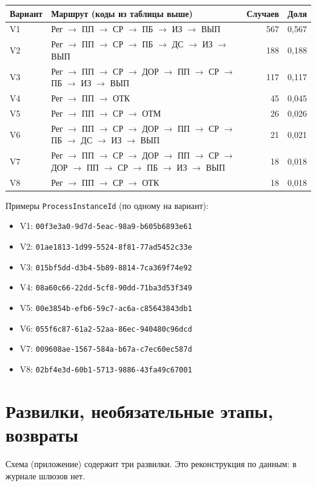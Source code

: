\documentclass[11pt,a4paper]{article}
\begin{document}
\begin{center}\small
\begin{tabular}{@{}lp{10.8cm}rr@{}}\toprule
Вариант & Маршрут (коды из таблицы выше) & Случаев & Доля\\\midrule
V1 & Рег $\to$ ПП $\to$ СР $\to$ ПБ $\to$ ИЗ $\to$ ВЫП & 567 & 0,567 \\
V2 & Рег $\to$ ПП $\to$ СР $\to$ ПБ $\to$ ДС $\to$ ИЗ $\to$ ВЫП & 188 & 0,188 \\
V3 & Рег $\to$ ПП $\to$ СР $\to$ ДОР $\to$ ПП $\to$ СР $\to$ ПБ $\to$ ИЗ $\to$ ВЫП & 117 & 0,117 \\
V4 & Рег $\to$ ПП $\to$ ОТК & 45 & 0,045 \\
V5 & Рег $\to$ ПП $\to$ СР $\to$ ОТМ & 26 & 0,026 \\
V6 & Рег $\to$ ПП $\to$ СР $\to$ ДОР $\to$ ПП $\to$ СР $\to$ ПБ $\to$ ДС $\to$ ИЗ $\to$ ВЫП & 21 & 0,021 \\
V7 & Рег $\to$ ПП $\to$ СР $\to$ ДОР $\to$ ПП $\to$ СР $\to$ ДОР $\to$ ПП $\to$ СР $\to$ ПБ $\to$ ИЗ $\to$ ВЫП & 18 & 0,018 \\
V8 & Рег $\to$ ПП $\to$ СР $\to$ ОТК & 18 & 0,018 \\
\bottomrule\end{tabular}
\end{center}

Примеры \texttt{ProcessInstanceId} (по одному на вариант):
\begin{itemize}\scriptsize
\item V1: \texttt{00f3e3a0-9d7d-5eac-98a9-b605b6893e61}
\item V2: \texttt{01ae1813-1d99-5524-8f81-77ad5452c33e}
\item V3: \texttt{015bf5dd-d3b4-5b89-8814-7ca369f74e92}
\item V4: \texttt{08a60c66-22dd-5cf8-90dd-71ba3d53f349}
\item V5: \texttt{00e3854b-efb6-59c7-ac6a-c85643843db1}
\item V6: \texttt{055f6c87-61a2-52aa-86ec-940480c96dcd}
\item V7: \texttt{009608ae-1567-584a-b67a-c7ec60ec587d}
\item V8: \texttt{02bf4e3d-60b1-5713-9886-43fa49c67001}
\end{itemize}

\section{Развилки, необязательные этапы, возвраты}
Схема (приложение) содержит три развилки. Это реконструкция по данным: в журнале шлюзов нет.
\end{document}

